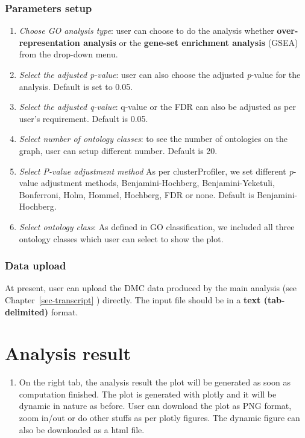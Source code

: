 \documentclass[
  a4paper,
  oneside,
  open=any]{scrreport}
\providecommand{\tightlist}{%
  \setlength{\itemsep}{0pt}\setlength{\parskip}{0pt}}\usepackage{longtable,booktabs,array}
\begin{document}
\hypertarget{parameters-setup}{%
\subsubsection{Parameters setup}\label{parameters-setup}}

\begin{enumerate}
\def\labelenumi{\arabic{enumi}.}
\tightlist
\item
  \emph{Choose GO analysis type}: user can choose to do the analysis
  whether \textbf{over-representation analysis} or the \textbf{gene-set
  enrichment analysis} (GSEA) from the drop-down menu.
\item
  \emph{Select the adjusted p-value}: user can also choose the adjusted
  \emph{p}-value for the analysis. Default is set to 0.05.
\item
  \emph{Select the adjusted q-value}: q-value or the FDR can also be
  adjusted as per user's requirement. Default is 0.05.
\item
  \emph{Select number of ontology classes}: to see the number of
  ontologies on the graph, user can setup different number. Default is
  20.
\item
  \emph{Select P-value adjustment method} As per clusterProfiler, we set
  different \emph{p}-value adjustment methods, Benjamini-Hochberg,
  Benjamini-Yeketuli, Bonferroni, Holm, Hommel, Hochberg, FDR or none.
  Default is Benjamini-Hochberg.
\item
  \emph{Select ontology class}: As defined in GO classification, we
  included all three ontology classes which user can select to show the
  plot.
\end{enumerate}

\hypertarget{data-upload-3}{%
\subsubsection{Data upload}\label{data-upload-3}}

At present, user can upload the DMC data produced by the main analysis
(see Chapter~\ref{sec-transcript} ) directly. The input file should be
in a \textbf{text (tab-delimited)} format.

\hypertarget{analysis-result-3}{%
\section{Analysis result}\label{analysis-result-3}}

\begin{enumerate}
\def\labelenumi{\arabic{enumi}.}
\tightlist
\item
  On the right tab, the analysis result the plot will be generated as
  soon as computation finished. The plot is generated with plotly and it
  will be dynamic in nature as before. User can download the plot as PNG
  format, zoom in/out or do other stuffs as per plotly figures. The
  dynamic figure can also be downloaded as a html file.
\end{enumerate}
\end{document}
